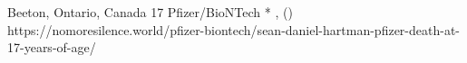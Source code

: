           {Beeton, Ontario, Canada}
          {17}
          {Pfizer/BioNTech}
          {*}
          {
            ,
             ()
          }
          {https://nomoresilence.world/pfizer-biontech/sean-daniel-hartman-pfizer-death-at-17-years-of-age/}


